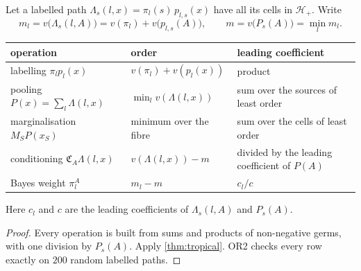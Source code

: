 \documentclass[11pt]{article}
\theoremstyle{definition}\newtheorem{definition}[theorem]{Definition}\newtheorem{remark}[theorem]{Remark}\newtheorem{example}[theorem]{Example}
\begin{document}
\begin{corollary}\label{cor:calculus}
Let a labelled path $\Lambda_s(l,x)=\pi_l(s)\,p_{l,s}(x)$ have all its cells in $\mathcal H_+$. Write
\[
m_l=v\bigl(\Lambda_s(l,A)\bigr)=v(\pi_l)+v\bigl(p_{l,s}(A)\bigr),\qquad m=v\bigl(P_s(A)\bigr)=\min_lm_l .
\]
\begin{center}\small
\begin{tabular}{lll}\toprule
operation & order & leading coefficient\\\midrule
labelling $\pi_lp_l(x)$ & $v(\pi_l)+v(p_l(x))$ & product\\
pooling $P(x)=\sum_l\Lambda(l,x)$ & $\min_lv(\Lambda(l,x))$ & sum over the sources of least order\\
marginalisation $M_SP(x_S)$ & minimum over the fibre & sum over the cells of least order\\
conditioning $\mathfrak C_A\Lambda(l,x)$ & $v(\Lambda(l,x))-m$ & divided by the leading coefficient of $P(A)$\\
Bayes weight $\pi^A_l$ & $m_l-m$ & $c_l/c$\\\bottomrule
\end{tabular}
\end{center}
Here $c_l$ and $c$ are the leading coefficients of $\Lambda_s(l,A)$ and $P_s(A)$.
\end{corollary}

\begin{proof}
Every operation is built from sums and products of non-negative germs, with one division by $P_s(A)$. Apply \cref{thm:tropical}. OR2 checks
every row exactly on $200$ random labelled paths.
\end{proof}
\end{document}
